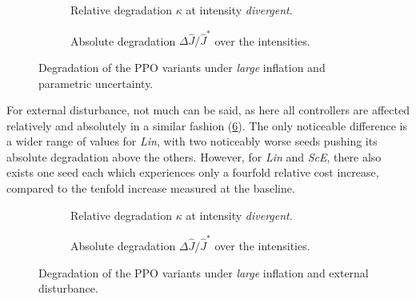 \begin{figure}[htbp]
  \centering
  \begin{subfigure}[t]{0.49\linewidth}
    \centering
    \caption{Relative degradation $\kappa$ at intensity \emph{divergent}.}
    \label{fig:rl-noise-large-parametric-divergent}
  \end{subfigure}\hfill
  \begin{subfigure}[t]{0.49\linewidth}
    \centering
    \caption{Absolute degradation $\Delta \hat{J} / \hat{J}^{*}$ over the intensities.}
    \label{fig:rl-noise-large-parametric-absolute}
  \end{subfigure}
  \caption{Degradation of the PPO variants under \emph{large} inflation and parametric uncertainty.}
  \label{fig:rl-noise-large-parametric}
\end{figure}


For external disturbance, not much can be said, as here all controllers are affected relatively and absolutely in a similar
fashion (\cref{fig:rl-noise-large-disturbance}). The only noticeable difference is a wider range of values for \emph{Lin}, with two noticeably worse seeds pushing
its absolute degradation above the others. However, for \emph{Lin} and \emph{ScE}, there also exists one seed
each which experiences only a fourfold relative cost increase, compared to the tenfold increase measured at the baseline.

\begin{figure}[htbp]
  \centering
  \begin{subfigure}[t]{0.49\linewidth}
    \centering
    \caption{Relative degradation $\kappa$ at intensity \emph{divergent}.}
    \label{fig:rl-noise-large-disturbance-divergent}
  \end{subfigure}\hfill
  \begin{subfigure}[t]{0.49\linewidth}
    \centering
    \caption{Absolute degradation $\Delta \hat{J} / \hat{J}^{*}$ over the intensities.}
    \label{fig:rl-noise-large-disturbance-absolute}
  \end{subfigure}
  \caption{Degradation of the PPO variants under \emph{large} inflation and external disturbance.}
  \label{fig:rl-noise-large-disturbance}
\end{figure}

